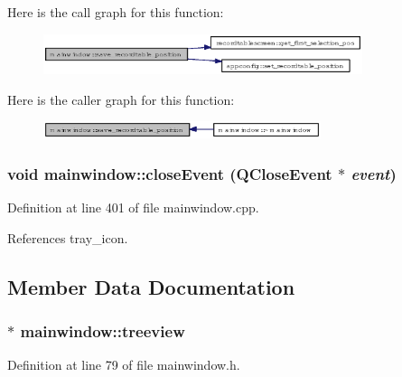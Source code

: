 Here is the call graph for this function:\begin{figure}[H]
\begin{center}
\leavevmode
\includegraphics[width=265pt]{classmainwindow_de588e1f1c0cc027d50038e075c90de2_cgraph}
\end{center}
\end{figure}


Here is the caller graph for this function:\begin{figure}[H]
\begin{center}
\leavevmode
\includegraphics[width=230pt]{classmainwindow_de588e1f1c0cc027d50038e075c90de2_icgraph}
\end{center}
\end{figure}
\subsubsection{\setlength{\rightskip}{0pt plus 5cm}void mainwindow::close\-Event (QClose\-Event $\ast$ {\em event})\hspace{0.3cm}{\tt  [protected]}}\label{classmainwindow_538c6f8c44d0545ac6124c43ce261e87}




Definition at line 401 of file mainwindow.cpp.

References tray\_\-icon.

\subsection{Member Data Documentation}
\subsubsection{$\ast$ {\bf mainwindow::treeview}}\label{classmainwindow_edd9c2c38ab9071fc3f7a3817fb3b84f}




Definition at line 79 of file mainwindow.h.

